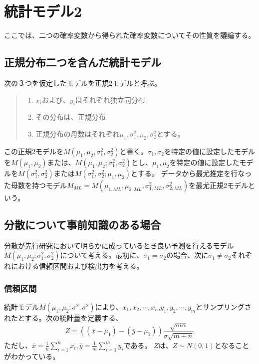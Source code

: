 

\chapter{統計モデル2}
ここでは、二つの確率変数から得られた確率変数についてその性質を議論する。

\section{正規分布二つを含んだ統計モデル}
次の３つを仮定したモデルを正規$2$モデルと呼ぶ。
\begin{quote}
    \begin{enumerate}[(1)]
    \item $x_i$および、$y_i$はそれぞれ独立同分布
    \item その分布は、正規分布
    \item 正規分布の母数はそれぞれ$\mu_1,\sigma_1^2,\mu_2,\sigma_2^2$とする。
    \end{enumerate}
\end{quote}
この正規2モデルを$M(\mu_1,\mu_2,\sigma_1^2,\sigma_2^2)$と書く。$\sigma_1,\sigma_2$を特定の値に設定したモデルを$M(\mu_1,\mu_2)$または、$M(\mu_1,\mu_2;\sigma^2_1,\sigma^2_2)$とし、$\mu_1,\mu_2$を特定の値に設定したモデルを$M(\sigma_1^2,\sigma_2^2)$または$M(\sigma_1^2,\sigma_2^2;\mu_1,\mu_2)$とする。
データから最尤推定を行なった母数を持つモデル$M_{ML}=M(\mu_{1,ML},\mu_{2,ML},\sigma_{1,ML}^2,\sigma^2_{2,ML})$を最尤正規2モデルという。

\section{分散について事前知識のある場合}
分散が先行研究において明らかに成っているとき良い予測を行えるモデル$M(\mu_1,\mu_2;\sigma^2_1,\sigma^2_2)$について考える。最初に、$\sigma_1=\sigma_2$の場合、次に$\sigma_1\neq \sigma_ 2$それぞれにおける信頼区間および検出力を考える。

\subsection{信頼区間}
統計モデル$M(\mu_1,\mu_2;\sigma^2,\sigma^2)$により、$x_1,x_2,\cdots,x_n$,$y_1,y_2,\cdots,y_m$とサンプリングされたとする。次の統計量を定義する、
$$
Z=((\bar{x}-\mu_1)-(\bar{y}-\mu_2))\frac{\sqrt{mn}}{\sigma\sqrt{m+n}}
$$
ただし、$\bar{x}=\frac{1}{n}\sum_{i=1}^{n} x_i,\bar{y}=\frac{1}{m}\sum_{i=1}^m y_i$である。
$Z$は、$Z\sim N(0,1)$となることがわかっている。

